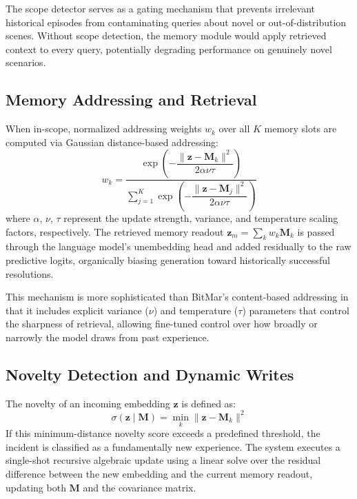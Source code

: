 The scope detector serves as a gating mechanism that prevents irrelevant historical episodes from contaminating queries about novel or out-of-distribution scenes. Without scope detection, the memory module would apply retrieved context to every query, potentially degrading performance on genuinely novel scenarios.

\subsection{Memory Addressing and Retrieval}
When in-scope, normalized addressing weights $w_k$ over all $K$ memory slots are computed via Gaussian distance-based addressing:
\begin{equation}
    w_k = \frac{\exp\!\left(-\dfrac{\|\mathbf{z} - \mathbf{M}_k\|^2}{2\alpha\nu\tau}\right)}{\displaystyle\sum_{j=1}^{K} \exp\!\left(-\dfrac{\|\mathbf{z} - \mathbf{M}_j\|^2}{2\alpha\nu\tau}\right)}
    \label{eq:embervlm_mem_address}
\end{equation}
where $\alpha$, $\nu$, $\tau$ represent the update strength, variance, and temperature scaling factors, respectively. The retrieved memory readout $\mathbf{z}_m = \sum_k w_k \mathbf{M}_k$ is passed through the language model's unembedding head and added residually to the raw predictive logits, organically biasing generation toward historically successful resolutions.

This mechanism is more sophisticated than BitMar's content-based addressing in that it includes explicit variance ($\nu$) and temperature ($\tau$) parameters that control the sharpness of retrieval, allowing fine-tuned control over how broadly or narrowly the model draws from past experience.

\subsection{Novelty Detection and Dynamic Writes}
\label{sec:memory_novelty}
The novelty of an incoming embedding $\mathbf{z}$ is defined as:
\begin{equation}
    \sigma(\mathbf{z} \mid \mathbf{M}) = \min_k \|\mathbf{z} - \mathbf{M}_k\|^2
\end{equation}
If this minimum-distance novelty score exceeds a predefined threshold, the incident is classified as a fundamentally new experience. The system executes a single-shot recursive algebraic update using a linear solve over the residual difference between the new embedding and the current memory readout, updating both $\mathbf{M}$ and the covariance matrix.

